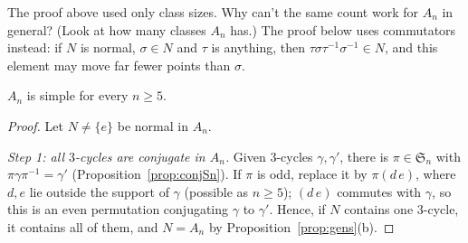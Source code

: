 \begin{think}
The proof above used only class sizes. Why can't the same count work for $A_n$ in general? (Look at how many classes $A_n$ has.) The proof below uses commutators instead: if $N$ is normal, $\sigma\in N$ and $\tau$ is anything, then $\tau\sigma\tau^{-1}\sigma^{-1}\in N$, and this element may move far fewer points than $\sigma$.
\end{think}

\begin{theorem}\label{thm:an}
$A_n$ is simple for every $n\ge5$.
\end{theorem}
\begin{proof}
Let $N\ne\{e\}$ be normal in $A_n$.

\emph{Step 1: all $3$-cycles are conjugate in $A_n$.} Given $3$-cycles $\gamma,\gamma'$, there is $\pi\in\mathfrak S_n$ with $\pi\gamma\pi^{-1}=\gamma'$ (Proposition~\ref{prop:conjSn}). If $\pi$ is odd, replace it by $\pi(d\,e)$, where $d,e$ lie outside the support of $\gamma$ (possible as $n\ge5$); $(d\,e)$ commutes with $\gamma$, so this is an even permutation conjugating $\gamma$ to $\gamma'$. Hence, if $N$ contains one $3$-cycle, it contains all of them, and $N=A_n$ by Proposition~\ref{prop:gens}(b).


\end{proof}
